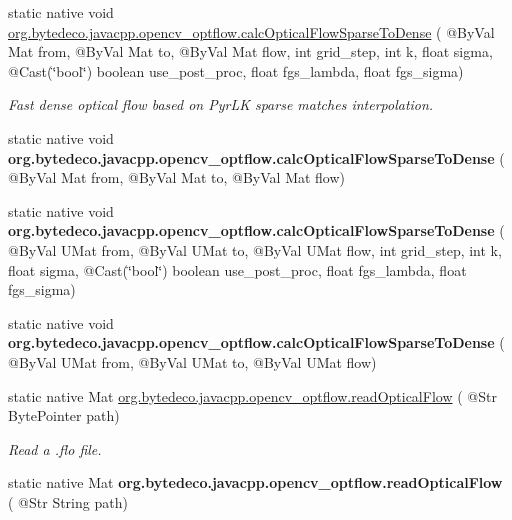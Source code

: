 \begin{DoxyCompactItemize}
\item 
static native void \hyperlink{group__optflow_gab202f6c782e9356cf2a96620732785a9}{org.\+bytedeco.\+javacpp.\+opencv\+\_\+optflow.\+calc\+Optical\+Flow\+Sparse\+To\+Dense} ( @By\+Val Mat from, @By\+Val Mat to, @By\+Val Mat flow, int grid\+\_\+step, int k, float sigma, @Cast(\char`\"{}bool\char`\"{}) boolean use\+\_\+post\+\_\+proc, float fgs\+\_\+lambda, float fgs\+\_\+sigma)
\begin{DoxyCompactList}\small\item\em Fast dense optical flow based on Pyr\+LK sparse matches interpolation. \end{DoxyCompactList}\item 
\mbox{\label{group__optflow_ga232800d9e04e7d3d9d6412b7bf695e11}} 
static native void {\bfseries org.\+bytedeco.\+javacpp.\+opencv\+\_\+optflow.\+calc\+Optical\+Flow\+Sparse\+To\+Dense} ( @By\+Val Mat from, @By\+Val Mat to, @By\+Val Mat flow)
\item 
\mbox{\label{group__optflow_ga1e7e5b5bb682863c28da8ee4375de834}} 
static native void {\bfseries org.\+bytedeco.\+javacpp.\+opencv\+\_\+optflow.\+calc\+Optical\+Flow\+Sparse\+To\+Dense} ( @By\+Val U\+Mat from, @By\+Val U\+Mat to, @By\+Val U\+Mat flow, int grid\+\_\+step, int k, float sigma, @Cast(\char`\"{}bool\char`\"{}) boolean use\+\_\+post\+\_\+proc, float fgs\+\_\+lambda, float fgs\+\_\+sigma)
\item 
\mbox{\label{group__optflow_gaad1826bcce1245d87fd9fb9f65b508d1}} 
static native void {\bfseries org.\+bytedeco.\+javacpp.\+opencv\+\_\+optflow.\+calc\+Optical\+Flow\+Sparse\+To\+Dense} ( @By\+Val U\+Mat from, @By\+Val U\+Mat to, @By\+Val U\+Mat flow)
\item 
static native Mat \hyperlink{group__optflow_ga8adc9b054c1518ab41c20d8ada51b9b7}{org.\+bytedeco.\+javacpp.\+opencv\+\_\+optflow.\+read\+Optical\+Flow} ( @Str Byte\+Pointer path)
\begin{DoxyCompactList}\small\item\em Read a .flo file. \end{DoxyCompactList}\item 
\mbox{\label{group__optflow_ga4b2573f3c0a1dd3b91b11e315791bd2f}} 
static native Mat {\bfseries org.\+bytedeco.\+javacpp.\+opencv\+\_\+optflow.\+read\+Optical\+Flow} ( @Str String path)

\end{DoxyCompactItemize}
